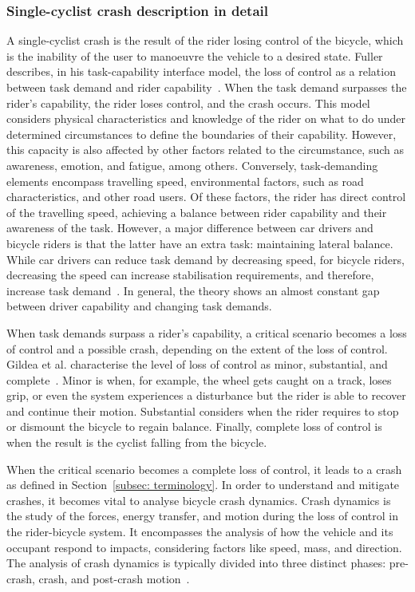 \documentclass{article}
\begin{document}
\subsubsection{Single-cyclist crash description in detail} \label{subsec: crash anatomy}
%
A single-cyclist crash is the result of the rider losing control of the bicycle, which is the inability of the user to manoeuvre the vehicle to a desired state.
%
Fuller describes, in his task-capability interface model, the loss of control as a relation between task demand and rider capability~\cite{Ful05}.
%
When the task demand surpasses the rider's capability, the rider loses control, and the crash occurs.
%
This model considers physical characteristics and knowledge of the rider on what to do under determined circumstances to define the boundaries of their capability.
%
However, this capacity is also affected by other factors related to the circumstance, such as awareness, emotion, and fatigue, among others.
%
Conversely, task-demanding elements encompass travelling speed, environmental factors, such as road characteristics, and other road users.
%
Of these factors, the rider has direct control of the travelling speed, achieving a balance between rider capability and their awareness of the task.
%
However, a major difference between car drivers and bicycle riders is that the latter have an extra task: maintaining lateral balance.
%
While car drivers can reduce task demand by decreasing speed, for bicycle riders, decreasing the speed can increase stabilisation requirements, and therefore, increase task demand~\cite{Koo11, Sch13, Vla15}.
%
In general, the theory shows an almost constant gap between driver capability and changing task demands.


When task demands surpass a rider's capability, a critical scenario becomes a loss of control and a possible crash, depending on the extent of the loss of control.
%
Gildea et al. characterise the level of loss of control as minor, substantial, and complete~\cite{Gil23a}.
%
Minor is when, for example, the wheel gets caught on a track, loses grip, or even the system experiences a disturbance but the rider is able to recover and continue their motion.
%
Substantial considers when the rider requires to stop or dismount the bicycle to regain balance.
%
Finally, complete loss of control is when the result is the cyclist falling from the bicycle.


When the critical scenario becomes a complete loss of control, it leads to a crash as defined in Section~\ref{subsec: terminology}.
%
In order to understand and mitigate crashes, it becomes vital to analyse bicycle crash dynamics.
%
Crash dynamics is the study of the forces, energy transfer, and motion during the loss of control in the rider-bicycle system.
%
It encompasses the analysis of how the vehicle and its occupant respond to impacts, considering factors like speed, mass, and direction.
%
The analysis of crash dynamics is typically divided into three distinct phases: pre-crash, crash, and post-crash motion~\cite{Par01}.
\end{document}
